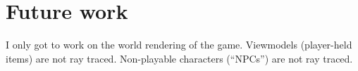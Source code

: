 \documentclass[]{article}
\begin{document}
\section{Future work}
I only got to work on the world rendering of the game.
Viewmodels (player-held items) are not ray traced.
Non-playable characters (\enquote{NPCs}) are not ray traced.

{}
%



\end{document}
